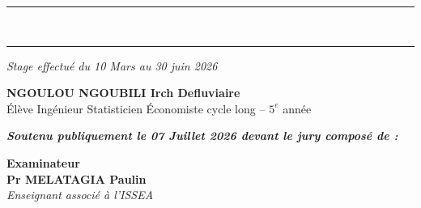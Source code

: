 \documentclass[12pt,twoside]{report}
\begin{document}
\begin{titlepage}
\begin{center}
    {\color{midblue}\rule[-0.002mm]{17cm}{2.2mm}} \\[0.0001cm]%
    \normalsize \textbf{\color{blue!100!black}{CONCEPTION D'UN PIPELINE HYBRIDE DE RECHERCHE SÉMANTIQUE POUR LES RECOMMANDATIONS D'EMPLOI--COMPÉTENCES, FONDÉ SUR LES LLMs ET LES GRAPHES DE CONNAISSANCES}}
    {\color{midblue}\rule[-0.002mm]{17cm}{2.2mm}}
\par\vspace{0.5mm}
    {\normalsize\textit{Stage effectué du 10 Mars au 30 juin 2026}}\\[0.3mm]
   \par\vspace{0.4mm}
    {\normalsize\bfseries NGOULOU NGOUBILI Irch Defluviaire}\\
    {\normalsize Élève Ingénieur Statisticien Économiste cycle long -- $5^e$ année}\\[0.04cm]
\end{center}
\vspace*{0.12cm}
\begin{center}
\footnotesize\textit{\textbf{Soutenu publiquement le 07 Juillet 2026 devant le jury composé de :}}
\end{center}
\vspace*{0.05cm}
\noindent
\footnotesize
\begin{minipage}[t]{0.33\textwidth}
\begin{center}
\textbf{Examinateur}\\[0.04cm]
\textbf{Pr MELATAGIA Paulin}\\[0.03cm]
\textit{Enseignant associé à l'ISSEA}
\end{center}
\end{minipage}%
\begin{minipage}[t]{0.33\textwidth}

\end{minipage}
\end{titlepage}
\end{document}
